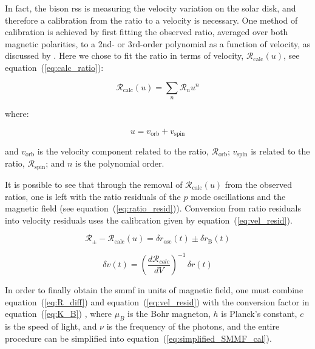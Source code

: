 In fact, the \gls{bison} \gls{rss} is measuring the velocity variation on the solar disk, and therefore a calibration from the ratio to a velocity is necessary. One method of calibration is achieved by first fitting the observed ratio, averaged over both magnetic polarities, to a 2nd- or 3rd-order polynomial as a function of velocity, as discussed by \citet{elsworth_techniques_1995}. Here we chose to fit the ratio in terms of velocity, $\mathcal{R}_{\mathrm{calc}}(u)$, see equation~(\ref{eq:calc_ratio}):

\begin{equation}
\mathcal{R}_{\mathrm{calc}}(u) = \sum_{n} \mathcal{R}_{n} u^n
\label{eq:calc_ratio}
\end{equation}

where:

\begin{equation}
u = v_{\mathrm{orb}} + v_{\mathrm{spin}}
\label{eq:stn_vel}
\end{equation}

and $v_{\mathrm{orb}}$ is the velocity component related to the ratio,  $\mathcal{R}_{\mathrm{orb}}$; $v_{\mathrm{spin}}$ is related to the ratio, $\mathcal{R}_{\mathrm{spin}}$; and $n$ is the polynomial order.

It is possible to see that through the removal of $\mathcal{R}_{\mathrm{calc}}(u)$ from the observed ratios, one is left with the ratio residuals of the $p$ mode oscillations and the magnetic field (see equation~(\ref{eq:ratio_resid})). Conversion from ratio residuals into velocity residuals uses the calibration given by equation~(\ref{eq:vel_resid}).

\begin{equation}
\mathcal{R}_{\pm} - \mathcal{R}_{\mathrm{calc}}(u) = \delta {r}_{\mathrm{osc}}(t) \pm \delta {r}_{\mathrm{B}}(t)
\label{eq:ratio_resid}
\end{equation}

\begin{equation}
\delta v(t) = \left( \frac{d\mathcal{R}_{calc}}{dV} \right)^{-1} \, \delta {r}(t)
\label{eq:vel_resid}
\end{equation}

In order to finally obtain the \gls{smmf} in units of magnetic field, one must combine equation~(\ref{eq:R_diff}) and  equation~(\ref{eq:vel_resid}) with the conversion factor in equation~(\ref{eq:K_B}) \citep{dumbill_observation_1999}, where $\mu_B$ is the Bohr magneton, $h$ is Planck's constant, $c$ is the speed of light, and $\nu$ is the frequency of the photons, and the entire procedure can be simplified into equation~(\ref{eq:simplified_SMMF_cal}).

